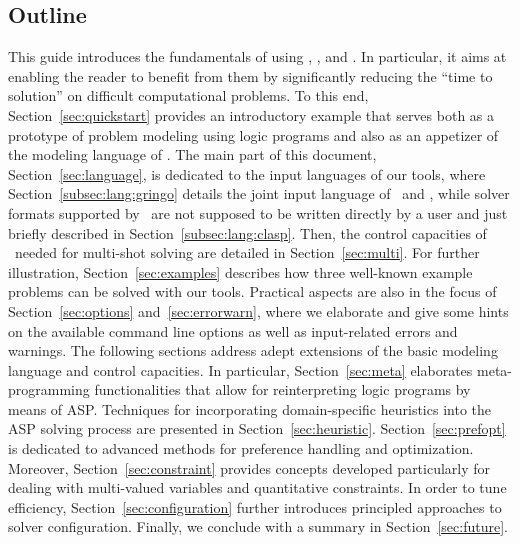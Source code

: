 \subsection{Outline}\label{sec:outline}

This guide introduces the fundamentals of using
\gringo, \clasp, and \clingo.
In particular, it aims at enabling the reader to benefit from them
by significantly reducing the ``time to solution'' on difficult computational problems.
To this end,
Section~\ref{sec:quickstart} provides an introductory example
that serves both as a prototype of problem modeling using logic programs
and also as an appetizer of the modeling language of \gringo.
The main part of this document, Section~\ref{sec:language},
is dedicated to the input languages of our tools,
where Section~\ref{subsec:lang:gringo}
details the joint input language of \gringo\ and \clingo,
while solver formats supported by \clasp\
are not supposed to be written directly by a user
and just briefly described in Section~\ref{subsec:lang:clasp}.
Then,
the control capacities of \clingo\ needed for multi-shot solving are detailed in Section~\ref{sec:multi}.
For further illustration,
Section~\ref{sec:examples} describes how three well-known example problems
can be solved with our tools.
Practical aspects are also in the focus of Section~\ref{sec:options} and~\ref{sec:errorwarn},
where we elaborate and give some hints on the available command line options
as well as input-related errors and warnings.
The following sections address adept extensions of the basic modeling language
and control capacities.
In particular, Section~\ref{sec:meta} elaborates meta-programming functionalities
that allow for reinterpreting logic programs by means of ASP.
Techniques for incorporating domain-specific heuristics into the ASP solving
process are presented in Section~\ref{sec:heuristic}.
Section~\ref{sec:prefopt} is dedicated to advanced methods
for preference handling and optimization.
Moreover, Section~\ref{sec:constraint} provides concepts developed particularly
for dealing with multi-valued variables and quantitative constraints.
In order to tune efficiency,
Section~\ref{sec:configuration} further introduces principled approaches
to solver configuration.
Finally, we conclude with a summary in Section~\ref{sec:future}.

